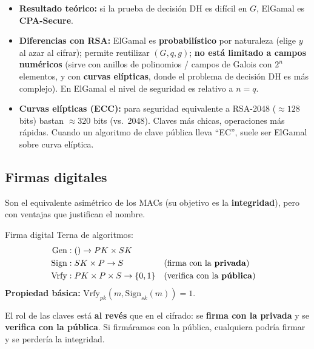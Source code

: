 \documentclass[../main.tex]{subfiles}
\begin{document}
\begin{itemize}[leftmargin=1.4em,nosep]
  \item \textbf{Resultado teórico:} si la prueba de decisión DH es difícil en $G$,
  ElGamal es \textbf{CPA-Secure}.
  \item \textbf{Diferencias con RSA:} ElGamal es \textbf{probabilístico} por
  naturaleza (elige $y$ al azar al cifrar); permite reutilizar $(G,q,g)$; \textbf{no
  está limitado a campos numéricos} (sirve con anillos de polinomios / campos de
  Galois con $2^n$ elementos, y con \textbf{curvas elípticas}, donde el problema de
  decisión DH es más complejo). En ElGamal el nivel de seguridad es relativo a
  $n=q$.
  \item \textbf{Curvas elípticas (ECC):} para seguridad equivalente a RSA-2048 ($\approx
  128$ bits) bastan $\approx 320$ bits (vs.\ 2048). Claves más chicas, operaciones
  más rápidas. Cuando un algoritmo de clave pública lleva ``EC'', suele ser ElGamal
  sobre curva elíptica.
\end{itemize}

\subsection{Firmas digitales}

Son el equivalente asimétrico de los MACs (su objetivo es la \textbf{integridad}),
pero con ventajas que justifican el nombre.

\begin{definicion}{Firma digital}
Terna de algoritmos:
\begin{align*}
\mathrm{Gen}&: ()\to PK\times SK\\
\mathrm{Sign}&: SK\times P\to S &&\text{(firma con la \textbf{privada})}\\
\mathrm{Vrfy}&: PK\times P\times S\to\{0,1\} &&\text{(verifica con la \textbf{pública})}
\end{align*}
\textbf{Propiedad básica:} $\mathrm{Vrfy}_{pk}(m,\mathrm{Sign}_{sk}(m))=1$.
\end{definicion}

\begin{destacado}
El rol de las claves está \textbf{al revés} que en el cifrado: se \textbf{firma con
la privada} y se \textbf{verifica con la pública}. Si firmáramos con la pública,
cualquiera podría firmar y se perdería la integridad.
\end{destacado}
\end{document}
